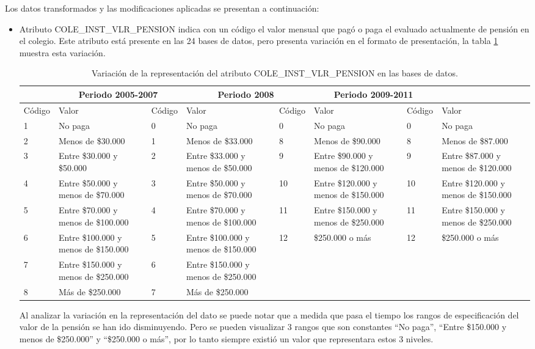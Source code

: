 Los datos transformados y las modificaciones aplicadas se presentan a continuación: 
\begin{itemize}
\item Atributo COLE\_INST\_VLR\_PENSION indica con un código el valor mensual que pagó o paga el evaluado actualmente de pensión en el colegio.  Este atributo está presente en las 24 bases de datos, pero presenta variación en el formato de presentación, la tabla \ref{tab:cuadro2} muestra esta variación.

\begin{table}[!htb]
\centering
\begin{tabular}{|p{1.5cm}|p{2cm}|p{1.5cm}|p{2cm}|p{1.5cm}|p{2cm}|p{1.5cm}|p{2cm}|}
\hline
	\rowcolor[gray]{0.9} 
	\multicolumn{2}{|c|}{
	\textbf{Periodo 2000-2004}} &
	\multicolumn{2}{|c|}{
	\textbf{Periodo 2005-2007}} &
	\multicolumn{2}{|c|}{
	\textbf{Periodo 2008}} &
	\multicolumn{2}{|c|}{
	\textbf{Periodo 2009-2011}}\\
\hline
	\rowcolor[gray]{0.5}
	Código & Valor &
	Código & Valor &
	Código & Valor &
	Código & Valor \\
\hline
1 & No paga & 0 & No paga & 0 & No paga & 0 & No paga \\
\hline
2 & Menos de \$30.000 & 1 & Menos de \$33.000 & 8 & Menos de \$90.000 & 8 & Menos de \$87.000\\
\hline
3 & Entre \$30.000 y \$50.000 & 2 & Entre \$33.000 y menos de \$50.000 & 9 & Entre \$90.000 y menos de \$120.000 & 9 & Entre \$87.000 y menos de \$120.000\\
\hline
4 & Entre \$50.000 y menos de \$70.000 & 3 & Entre \$50.000 y menos de \$70.000 & 10 & Entre \$120.000 y menos de \$150.000 & 10 & Entre \$120.000 y menos de \$150.000\\
\hline
5 & Entre \$70.000 y menos de \$100.000 & 4 & Entre \$70.000 y menos de \$100.000 & 11 & Entre \$150.000 y menos de \$250.000 & 11 & Entre \$150.000 y menos de \$250.000\\
\hline
6 & Entre \$100.000 y menos de \$150.000 & 5 & Entre \$100.000 y menos de \$150.000 & 12 & \$250.000 o más & 12 & \$250.000 o más\\
\hline
7 & Entre \$150.000 y menos de \$250.000 & 6 & Entre \$150.000 y menos de \$250.000 & & & &\\
\hline
8 & Más de \$250.000 & 7 & Más de \$250.000 & & & &\\
\hline
\end{tabular}
\caption{Variación de la representación del atributo COLE\_INST\_VLR\_PENSION en las bases de datos.}
\label{tab:cuadro2}
\end{table}
Al analizar la variación en la representación del dato se puede notar que a medida que pasa el tiempo los rangos de especificación del valor de la pensión se han ido disminuyendo. Pero se pueden visualizar 3 rangos que son constantes ``No paga'', ``Entre \$150.000 y menos de \$250.000'' y ``\$250.000 o más'', por lo tanto siempre existió un valor que representara estos 3 niveles.


\end{itemize}

